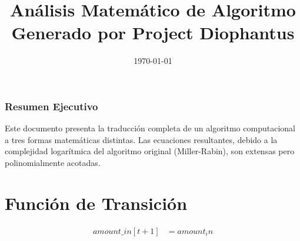 \documentclass[10pt, a4paper]{article}
\title{Análisis Matemático de Algoritmo \\ \large Generado por Project Diophantus}
\author{}
\date{\today}
\begin{document}
\maketitle
\section*{Resumen Ejecutivo}
Este documento presenta la traducción completa de un algoritmo computacional a tres formas matemáticas distintas.
Las ecuaciones resultantes, debido a la complejidad logarítmica del algoritmo original (Miller-Rabin), son extensas pero polinomialmente acotadas.
\part{Función de Transición}
\begin{align*}
amount\_in[t+1] &= amount_in \\

\end{align*}
\end{document}
